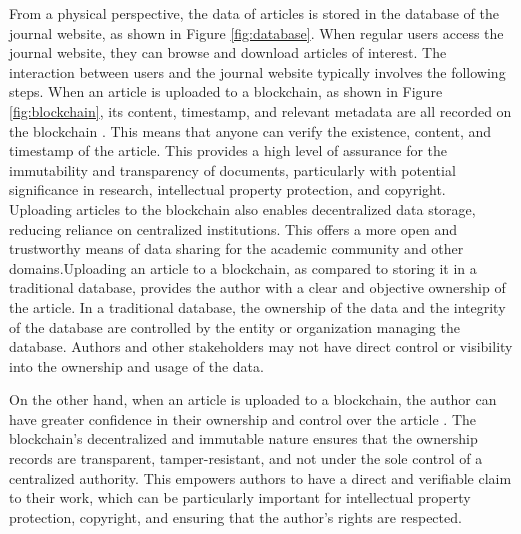 \documentclass[lettersize,journal]{IEEEtran}
\begin{document}
From a physical perspective, the data of articles is stored in the database of the journal website, as shown in Figure \ref{fig:database}. When regular users access the journal website, they can browse and download articles of interest. The interaction between users and the journal website typically involves the following steps.
When an article is uploaded to a blockchain, as shown in Figure \ref{fig:blockchain}, its content, timestamp, and relevant metadata are all recorded on the blockchain \cite{chowdhury2018blockchain}. This means that anyone can verify the existence, content, and timestamp of the article. This provides a high level of assurance for the immutability and transparency of documents, particularly with potential significance in research, intellectual property protection, and copyright. Uploading articles to the blockchain also enables decentralized data storage, reducing reliance on centralized institutions. This offers a more open and trustworthy means of data sharing for the academic community and other domains.Uploading an article to a blockchain, as compared to storing it in a traditional database, provides the author with a clear and objective ownership of the article. In a traditional database, the ownership of the data and the integrity of the database are controlled by the entity or organization managing the database. Authors and other stakeholders may not have direct control or visibility into the ownership and usage of the data.

On the other hand, when an article is uploaded to a blockchain, the author can have greater confidence in their ownership and control over the article \cite{mcconaghy2017visibility}. The blockchain's decentralized and immutable nature ensures that the ownership records are transparent, tamper-resistant, and not under the sole control of a centralized authority. This empowers authors to have a direct and verifiable claim to their work, which can be particularly important for intellectual property protection, copyright, and ensuring that the author's rights are respected.
\end{document}
